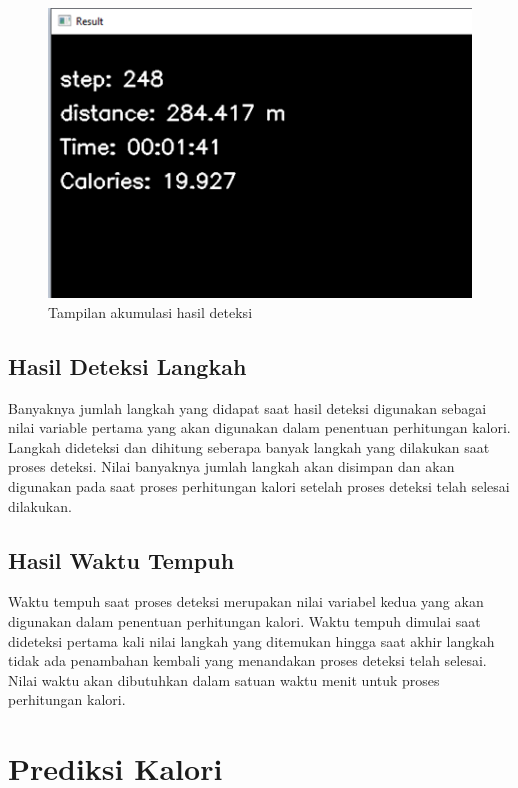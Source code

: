 \begin{figure}[H]
  \centering
  \includegraphics[scale=0.8]{gambar/hasil deteksi2.png}
  \caption{Tampilan akumulasi hasil deteksi}
  \label{fig:HasilDeteksi2}
\end{figure}

\subsection{Hasil Deteksi Langkah}
\label{subsec:HasilLangkah}

Banyaknya jumlah langkah yang didapat saat hasil deteksi digunakan sebagai nilai variable pertama yang akan digunakan dalam penentuan perhitungan kalori. Langkah dideteksi dan dihitung seberapa banyak langkah yang dilakukan saat proses deteksi. Nilai banyaknya jumlah langkah akan disimpan dan akan digunakan pada saat proses perhitungan kalori setelah proses deteksi telah selesai dilakukan.

\subsection{Hasil Waktu Tempuh}
\label{subsec:HasilWaktu}

Waktu tempuh saat proses deteksi merupakan nilai variabel kedua yang akan digunakan dalam penentuan perhitungan kalori. Waktu tempuh dimulai saat dideteksi pertama kali nilai langkah yang ditemukan hingga saat akhir langkah tidak ada penambahan kembali yang menandakan proses deteksi telah selesai. Nilai waktu akan dibutuhkan dalam satuan waktu menit untuk proses perhitungan kalori.

\section{Prediksi Kalori}
\label{sec:PrediksiKalori}

